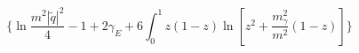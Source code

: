 \begin{equation}\biggl\{\ln\frac{m^{2}|\widetilde{q}|^{2}}{4}-1+2\gamma_{E}
+6\int_{0}^{1}z(1-z)\ln[z^{2}+\frac{m_{\gamma}^{2}}{m^{2}}(1-z)]\biggr\}
\end{equation}

